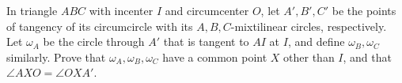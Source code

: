 In triangle $ABC$ with incenter $I$ and circumcenter $O$, let $A',B',C'$ be the points of tangency of its circumcircle with its $A,B,C$-mixtilinear circles, respectively.  Let $\omega_A$ be the circle through $A'$ that is tangent to $AI$ at $I$, and define $\omega_B, \omega_C$ similarly. Prove that $\omega_A,\omega_B,\omega_C$ have a common point $X$ other than $I$, and that $\angle AXO = \angle OXA'$.

